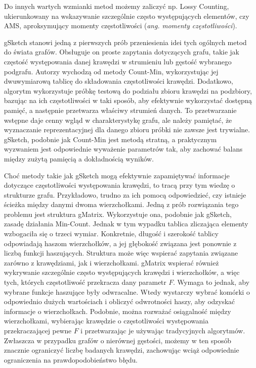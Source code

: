     Do innych wartych wzmianki metod możemy zaliczyć np. Lossy Counting\cite{Manku_Motwani_2012}, ukierunkowany na wskazywanie szczególnie często występujących elementów, czy AMS\cite{Alon_Matias_Szegedy_1996}, aproksymujący momenty częstotliwości (\emph{ang. momenty częstotliwości}).
    
    gSketch\cite{Zhao_Aggarwal_Wang_2011} stanowi jedną z pierwszych prób przeniesienia idei tych ogólnych metod do świata grafów. Obsługuje on proste zapytania dotyczących grafu, takie jak częstość występowania danej krawędzi w strumieniu lub gęstość wybranego podgrafu. Autorzy wychodzą od metody Count-Min, wykorzystując jej dwuwymiarową tablicę do składowania częstotliwości krawędzi. Dodatkowo, algorytm wykorzystuje próbkę testową do podziału zbioru krawędzi na podzbiory, bazując na ich częstotliwości w taki sposób, aby efektywnie wykorzystać dostępną pamięć, a następnie przetwarza właściwy strumień danych. To przetwarzanie wstępne daje cenny wgląd w charakterystykę grafu, ale należy pamiętać, że wyznaczanie reprezentacyjnej dla danego zbioru próbki nie zawsze jest trywialne. gSketch, podobnie jak Count-Min jest metodą stratną, a praktycznym wyzwaniem jest odpowiednie wyważenie parametrów tak, aby zachować balans między zużytą pamięcią a dokładnością wyników.
    
    Choć metody takie jak gSketch mogą efektywnie zapamiętywać informacje dotyczące częstotliwości występowania krawędzi, to tracą przy tym wiedzę o strukturze grafu. Przykładowo, trudno za ich pomocą odpowiedzieć, czy istnieje ścieżka między danymi dwoma wierzchołkami. Jedną z prób rozwiązania tego problemu jest struktura gMatrix\cite{Khan_Aggarwal_2016}. Wykorzystuje ona, podobnie jak gSketch, zasadę działania Min-Count. Jednak w tym wypadku tablica zliczająca elementy wzbogaciła się o trzeci wymiar. Konkretnie, długość i szerokość tablicy odpowiadają haszom wierzchołków, a jej głębokość związana jest ponownie z liczbą funkcji haszujących. Struktura może więc wspierać zapytania związane zarówno z krawędziami, jak i wierzchołkami. gMatrix wspierać również wykrywanie szczególnie często występujących krawędzi i wierzchołków, a więc tych, których częstotliwość przekracza dany parametr $F$. Wymaga to jednak, aby wybrane funkcje haszujące były odwracalne. Wtedy wystarczy wybrać komórki o odpowiednio dużych wartościach i obliczyć odwrotności haszy, aby odzyskać informacje o wierzchołkach. Podobnie, można rozważać osiągalność między wierzchołkami, wybierając krawędzie o częstotliwości występowania przekraczającej pewne $F$ i przetwarzając je używając tradycyjnych algorytmów. Zwłaszcza w przypadku grafów o nierównej gęstości, możemy w ten sposób znacznie ograniczyć liczbę badanych krawędzi, zachowując wciąż odpowiednie ograniczenia na prawdopodobieństwo błędu.

